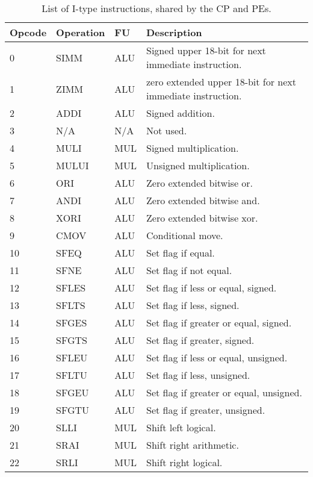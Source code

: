 \begin{table}[h]
\caption{List of I-type instructions, shared by the CP and PEs.}
\begin{center}
\begin{tabular}{@{}p{}p{}p{}p{}@{}}
\toprule
\textbf{Opcode} & \textbf{Operation} & \textbf{FU} & \textbf{Description}\\ \hline
0 & SIMM & ALU	& Signed upper 18-bit for next immediate instruction. \\ 
1 & ZIMM & ALU	& zero extended upper 18-bit for next immediate instruction. \\ 
2 & ADDI & ALU	& Signed addition. \\ 
3 & N/A & N/A		& Not used. \\ 
4 & MULI & MUL	& Signed multiplication. \\ 
5 & MULUI & MUL	& Unsigned multiplication. \\ 
6 & ORI & ALU		& Zero extended bitwise or. \\ 
7 & ANDI & ALU	& Zero extended bitwise and. \\ 
8 & XORI & ALU	& Zero extended bitwise xor. \\ 
9 & CMOV & ALU	& Conditional move. \\ 
10 & SFEQ & ALU	& Set flag if equal. \\ 
11 & SFNE & ALU	& Set flag if not equal. \\ 
12 & SFLES & ALU	& Set flag if less or equal, signed. \\ 
13 & SFLTS & ALU	& Set flag if less, signed. \\ 
14 & SFGES & ALU	& Set flag if greater or equal, signed. \\ 
15 & SFGTS & ALU	& Set flag if greater, signed. \\ 
16 & SFLEU & ALU	& Set flag if less or equal, unsigned. \\ 
17 & SFLTU & ALU	& Set flag if less, unsigned. \\ 
18 & SFGEU & ALU	& Set flag if greater or equal, unsigned. \\ 
19 & SFGTU & ALU	& Set flag if greater, unsigned. \\ 
20 & SLLI & MUL	& Shift left logical. \\ 
21 & SRAI & MUL	& Shift right arithmetic. \\ 
22 & SRLI & MUL	& Shift right logical. \\ 

\end{tabular}
\end{center}
\end{table}
